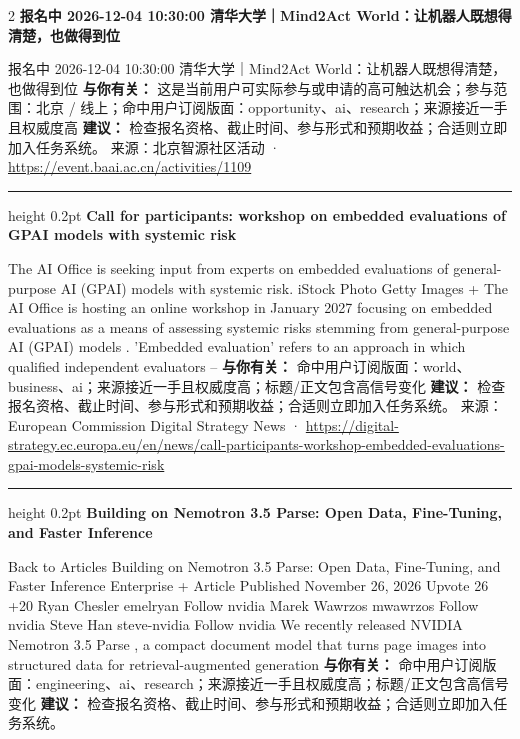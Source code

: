\documentclass[10.5pt]{ctexart}
\begin{document}
\begin{multicols}{2}
{\large\bfseries 报名中 2026-12-04 10:30:00 清华大学｜Mind2Act World：让机器人既想得清楚，也做得到位}\par
报名中 2026-12-04 10:30:00 清华大学｜Mind2Act World：让机器人既想得清楚，也做得到位
\textbf{与你有关：} 这是当前用户可实际参与或申请的高可触达机会；参与范围：北京 / 线上；命中用户订阅版面：opportunity、ai、research；来源接近一手且权威度高
\textbf{建议：} 检查报名资格、截止时间、参与形式和预期收益；合适则立即加入任务系统。
{\footnotesize\color{ormuted} 来源：北京智源社区活动 · \url{https://event.baai.ac.cn/activities/1109}}
\vspace{2mm}
\hrule height 0.2pt
\vspace{2mm}
{\large\bfseries Call for participants: workshop on embedded evaluations of GPAI models with systemic risk}\par
The AI Office is seeking input from experts on embedded evaluations of general-purpose AI (GPAI) models with systemic risk. iStock Photo Getty Images + The AI Office is hosting an online workshop in January 2027 focusing on embedded evaluations as a means of assessing systemic risks stemming from general-purpose AI (GPAI) models . 'Embedded evaluation' refers to an approach in which qualified independent evaluators –
\textbf{与你有关：} 命中用户订阅版面：world、business、ai；来源接近一手且权威度高；标题/正文包含高信号变化
\textbf{建议：} 检查报名资格、截止时间、参与形式和预期收益；合适则立即加入任务系统。
{\footnotesize\color{ormuted} 来源：European Commission Digital Strategy News · \url{https://digital-strategy.ec.europa.eu/en/news/call-participants-workshop-embedded-evaluations-gpai-models-systemic-risk}}
\vspace{2mm}
\hrule height 0.2pt
\vspace{2mm}
{\large\bfseries Building on Nemotron 3.5 Parse: Open Data, Fine-Tuning, and Faster Inference}\par
Back to Articles Building on Nemotron 3.5 Parse: Open Data, Fine-Tuning, and Faster Inference Enterprise + Article Published November 26, 2026 Upvote 26 +20 Ryan Chesler emelryan Follow nvidia Marek Wawrzos mwawrzos Follow nvidia Steve Han steve-nvidia Follow nvidia We recently released NVIDIA Nemotron 3.5 Parse , a compact document model that turns page images into structured data for retrieval-augmented generation 
\textbf{与你有关：} 命中用户订阅版面：engineering、ai、research；来源接近一手且权威度高；标题/正文包含高信号变化
\textbf{建议：} 检查报名资格、截止时间、参与形式和预期收益；合适则立即加入任务系统。

\end{multicols}
\end{document}
